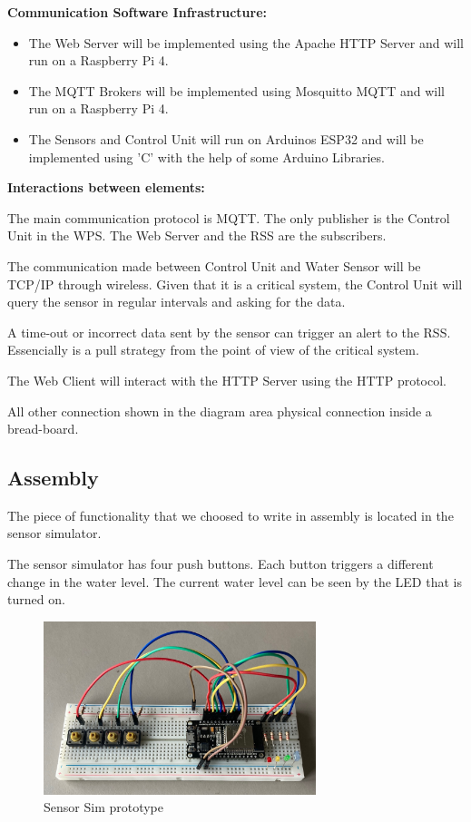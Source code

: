 \documentclass[11pt]{article}
\begin{document}
\textbf{Communication Software Infrastructure:}

\begin{itemize}
	\item The Web Server will be implemented using the Apache HTTP Server and will run on a Raspberry Pi 4.
	\item The MQTT Brokers will be implemented using Mosquitto MQTT and will run on a Raspberry Pi 4.
	\item The Sensors and Control Unit will run on Arduinos ESP32 and will be implemented using 'C' with the help of some Arduino Libraries. 
\end{itemize}

\textbf{Interactions between elements:}

The main communication protocol is MQTT. The only publisher is the Control Unit in the WPS. The Web Server and the RSS are the subscribers.

The communication made between Control Unit and Water Sensor will be TCP/IP through wireless. Given that it is a critical system, the Control Unit will query the sensor in regular intervals and asking for the data.

A time-out or incorrect data sent by the sensor can trigger an alert to the RSS. Essencially is a pull strategy from the point of view of the critical system.

The Web Client will interact with the HTTP Server using the HTTP protocol.

All other connection shown in the diagram area physical connection inside a bread-board.


\subsection{Assembly}

The piece of functionality that we choosed to write in assembly is located in the sensor simulator.

The sensor simulator has four push buttons. Each button triggers a different change in the water level. 
The current water level can be seen by the LED that is turned on.

\begin{figure}[H]
  \centering
  \includegraphics[width=300px]{../diagrams/sensor-sim-01.jpg}
  \caption{Sensor Sim prototype}
  \label{fig:Sensor sim prototype}
\end{figure}
\end{document}
